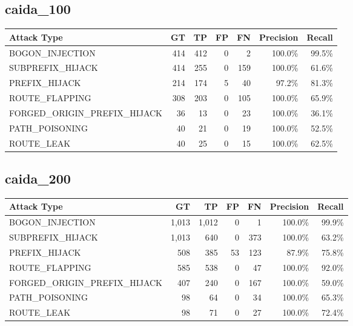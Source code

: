 \documentclass[10pt,a4paper]{article}
\begin{document}
\subsection{caida\_100}
\begin{table}[h]
\centering
\small
\begin{tabular}{lrrrrrr}
\toprule
Attack Type & GT & TP & FP & FN & Precision & Recall \\
\midrule

BOGON\_INJECTION & 414 & 412 & 0 & 2 & 100.0\% & 99.5\% \\
SUBPREFIX\_HIJACK & 414 & 255 & 0 & 159 & 100.0\% & 61.6\% \\
PREFIX\_HIJACK & 214 & 174 & 5 & 40 & 97.2\% & 81.3\% \\
ROUTE\_FLAPPING & 308 & 203 & 0 & 105 & 100.0\% & 65.9\% \\
FORGED\_ORIGIN\_PREFIX\_HIJACK & 36 & 13 & 0 & 23 & 100.0\% & 36.1\% \\
PATH\_POISONING & 40 & 21 & 0 & 19 & 100.0\% & 52.5\% \\
ROUTE\_LEAK & 40 & 25 & 0 & 15 & 100.0\% & 62.5\% \\
\bottomrule
\end{tabular}
\end{table}

\subsection{caida\_200}
\begin{table}[h]
\centering
\small
\begin{tabular}{lrrrrrr}
\toprule
Attack Type & GT & TP & FP & FN & Precision & Recall \\
\midrule

BOGON\_INJECTION & 1,013 & 1,012 & 0 & 1 & 100.0\% & 99.9\% \\
SUBPREFIX\_HIJACK & 1,013 & 640 & 0 & 373 & 100.0\% & 63.2\% \\
PREFIX\_HIJACK & 508 & 385 & 53 & 123 & 87.9\% & 75.8\% \\
ROUTE\_FLAPPING & 585 & 538 & 0 & 47 & 100.0\% & 92.0\% \\
FORGED\_ORIGIN\_PREFIX\_HIJACK & 407 & 240 & 0 & 167 & 100.0\% & 59.0\% \\
PATH\_POISONING & 98 & 64 & 0 & 34 & 100.0\% & 65.3\% \\
ROUTE\_LEAK & 98 & 71 & 0 & 27 & 100.0\% & 72.4\% \\
\bottomrule
\end{tabular}
\end{table}
\end{document}
